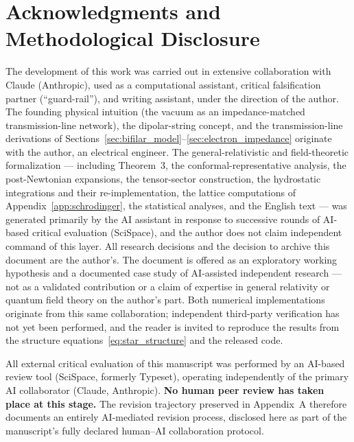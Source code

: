 \documentclass[11pt,a4paper]{article}
\theoremstyle{plain}
\theoremstyle{remark}
\begin{document}
\section*{Acknowledgments and Methodological Disclosure}
The development of this work was carried out in extensive collaboration with Claude (Anthropic), used as a computational assistant, critical falsification partner (``guard-rail''), and writing assistant, under the direction of the author. The founding physical intuition (the vacuum as an impedance-matched transmission-line network), the dipolar-string concept, and the transmission-line derivations of Sections~\ref{sec:bifilar_model}--\ref{sec:electron_impedance} originate with the author, an electrical engineer. The general-relativistic and field-theoretic formalization --- including Theorem~3, the conformal-representative analysis, the post-Newtonian expansions, the tensor-sector construction, the hydrostatic integrations and their re-implementation, the lattice computations of Appendix~\ref{app:schrodinger}, the statistical analyses, and the English text --- was generated primarily by the AI assistant in response to successive rounds of AI-based critical evaluation (SciSpace), and the author does not claim independent command of this layer. All research decisions and the decision to archive this document are the author's. The document is offered as an exploratory working hypothesis and a documented case study of AI-assisted independent research --- not as a validated contribution or a claim of expertise in general relativity or quantum field theory on the author's part. Both numerical implementations originate from this same collaboration; independent third-party verification has not yet been performed, and the reader is invited to reproduce the results from the structure equations~\eqref{eq:star_structure} and the released code.

All external critical evaluation of this manuscript was performed by an AI-based review tool (SciSpace, formerly Typeset), operating independently of the primary AI collaborator (Claude, Anthropic). \textbf{No human peer review has taken place at this stage.} The revision trajectory preserved in Appendix~A therefore documents an entirely AI-mediated revision process, disclosed here as part of the manuscript's fully declared human--AI collaboration protocol.

\newpage
\appendix

\end{document}
